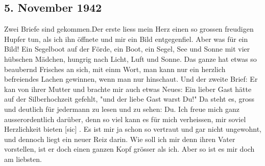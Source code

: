 \subsection{5. November 1942}

Zwei Briefe sind gekommen.Der erste liess mein Herz einen so grossen freudigen Hupfer tun, als ich ihn \"{o}ffnete und mir ein Bild entgegenfiel.
Aber was f\"{u}r ein Bild!
Ein Segelboot auf der F\"{o}rde, ein Boot, ein Segel, See und Sonne mit vier h\"{u}bschen M\"{a}dchen, hungrig nach Licht, Luft und Sonne.
Das ganze hat etwas so beaubernd Frisches an sich, mit einm Wort, man kann nur ein herzlich befreiendes Lachen gewinnen, wenn man nur hinschaut.
Und der zweite Brief: Er kan von ihrer Mutter und brachte mir auch etwas Neues: Ein lieber Gast h\"{a}tte auf der Silberhochzeit gefehlt, "und der liebe Gast warst Du!"
Da steht es, gross und deutlich f\"{u}r jedermann zu lesen und zu sehen: Du.
Ich freue mich ganz ausserordentlich dar\"{u}ber, denn so viel kann es f\"{u}r mich verheissen, mir soviel Herzlichkeit bieten{\color{red} [sic] }.
Es ist mir ja schon so vertraut und gar nicht ungewohnt, und dennoch liegt ein neuer Reiz darin.
Wie soll ich mir denn ihren Vater vorstellen, ist er doch einen ganzen Kopf gr\"{o}sser als ich.
Aber so ist es mir doch am liebsten.

\clearpage
